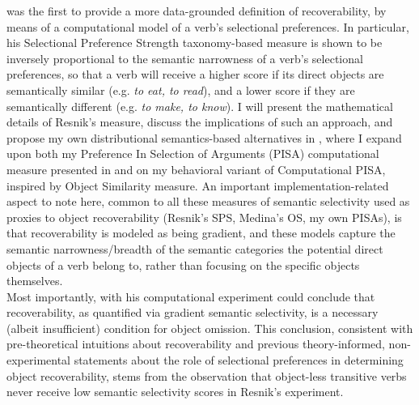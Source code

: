 \textcite{Resnik1993, Resnik1996} was the first to provide a more data-grounded definition of recoverability, by means of a computational model of a verb's selectional preferences. In particular, his Selectional Preference Strength taxonomy-based measure is shown to be inversely proportional to the semantic narrowness of a verb's selectional preferences, so that a verb will receive a higher score if its direct objects are semantically similar (e.g. \textit{to eat, to read}), and a lower score if they are semantically different (e.g. \textit{to make, to know}). I will present the mathematical details of Resnik's measure, discuss the implications of such an approach, and propose my own distributional semantics-based alternatives in , where I expand upon both my Preference In Selection of Arguments (PISA) computational measure presented in \textcite{CappelliLenciPISA} and on my behavioral variant of Computational PISA, inspired by  Object Similarity measure. An important implementation-related aspect to note here, common to all these measures of semantic selectivity used as proxies to object recoverability (Resnik's SPS, Medina's OS, my own PISAs), is that recoverability is modeled as being gradient, and these models capture the semantic narrowness/breadth of the semantic categories the potential direct objects of a verb belong to, rather than focusing on the specific objects themselves.\\
Most importantly, with his computational experiment \textcite[88]{Resnik1993} could conclude that recoverability, as quantified via gradient semantic selectivity, is a necessary (albeit insufficient) condition for object omission. This conclusion, consistent with pre-theoretical intuitions about recoverability and previous theory-informed, non-experimental statements about the role of selectional preferences in determining object recoverability, stems from the observation that object-less transitive verbs never receive low semantic selectivity scores in Resnik's experiment.


